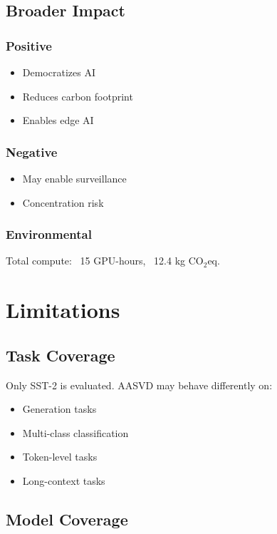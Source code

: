 \subsection{Broader Impact}

\subsubsection{Positive}
\begin{itemize}
\item Democratizes AI
\item Reduces carbon footprint
\item Enables edge AI

\end{itemize}
\subsubsection{Negative}
\begin{itemize}
\item May enable surveillance
\item Concentration risk

\end{itemize}
\subsubsection{Environmental}
Total compute: ~15 GPU-hours, ~12.4 kg CO$_2$eq.


\section{Limitations}

\subsection{Task Coverage}

Only SST-2 is evaluated. AASVD may behave differently on:
\begin{itemize}
\item Generation tasks
\item Multi-class classification
\item Token-level tasks
\item Long-context tasks

\end{itemize}
\subsection{Model Coverage}


